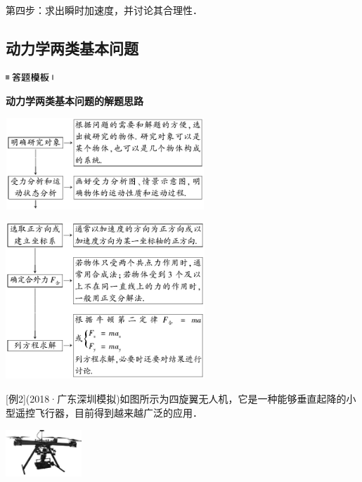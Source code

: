 \documentclass[cn,10.5pt,chinese,mac,chinesefont=founder]{elegantbook}
\begin{document}
第四步：求出瞬时加速度，并讨论其合理性．
\newpage
\subsection{动力学两类基本问题}

\begin{center}\includegraphics[width=0.70833in,height=0.125in]{media/image25.png}

\textbf{动力学两类基本问题的解题思路}
\end{center}


\begin{center}\includegraphics[width=2.94792in,height=1.35417in]{media/image104.png}\end{center}
\begin{center}\includegraphics[width=2.94792in,height=2.32292in]{media/image105.png}\end{center}

{[}例2{]}(2018·广东深圳模拟)如图所示为四旋翼无人机，它是一种能够垂直起降的小型遥控飞行器，目前得到越来越广泛的应用．

\begin{center}\includegraphics[width=1.125in,height=0.69792in]{media/image106.png}\end{center}
\end{document}
